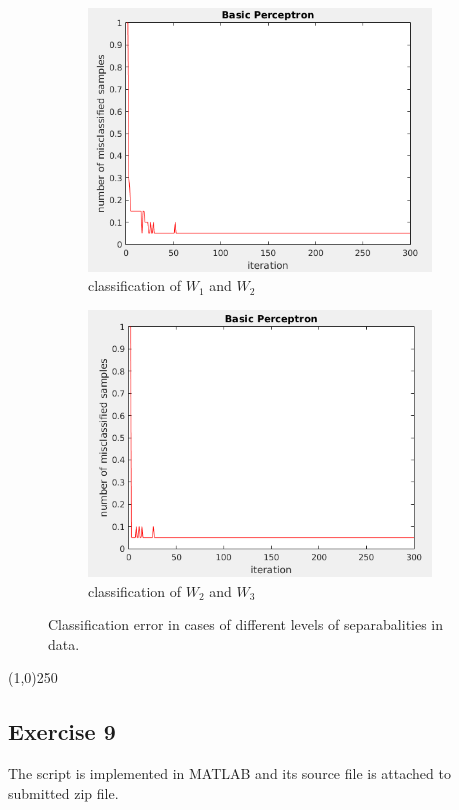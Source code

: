 \documentclass[12pt]{article}
\begin{document}
\begin{figure}[h]
\centering
\begin{subfigure}{0.4\textwidth}
	\includegraphics[scale=0.3]{Imgs/ce2-1.png}
	\caption{classification of $W_1$ and $W_2$}
\end{subfigure}
\begin{subfigure}{0.4\textwidth}
	\includegraphics[scale=0.3]{Imgs/ce2-3.png}
	\caption{classification of $W_2$ and $W_3$}
\end{subfigure}
\caption{Classification error in cases of different levels of separabalities in data.}
\label{fig:ce2-1}

\end{figure}

\begin{center}
\line(1,0){250}
\end{center}

\subsection{Exercise 9}
The script is implemented in MATLAB and its source file is attached to submitted zip file.
\end{document}
